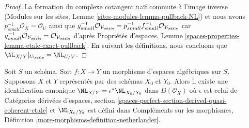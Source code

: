 \begin{proof}
La formation du complexe cotangent naïf commute à l'image inverse
(Modules sur les sites, Lemme \ref{sites-modules-lemma-pullback-NL})
et nous avons $p_{small}^{-1}\mathcal{O}_X = \mathcal{O}_U$ ainsi que
$g_{small}^{-1}\mathcal{O}_{V_\etale} =
p_{small}^{-1}f_{small}^{-1}\mathcal{O}_{Y_\etale}$
car $q_{small}^{-1}\mathcal{O}_{Y_\etale} =
\mathcal{O}_{V_\etale}$ d'après Propriétés d'espaces, Lemme
\ref{spaces-properties-lemma-etale-exact-pullback}.
En suivant les définitions, nous concluons que
$\NL_{X/Y}|_{U_\etale} = \NL_{U/V}$.
\end{proof}

\begin{lemma}
\label{lemma-NL-compare-spaces-schemes}
Soit $S$ un schéma. Soit $f : X \to Y$ un morphisme d'espaces algébriques
sur $S$. Supposons $X$ et $Y$ représentés par des schémas $X_0$ et $Y_0$.
Alors il existe une identification canonique
$\NL_{X/Y} = \epsilon^*\NL_{X_0/Y_0}$ dans $D(\mathcal{O}_X)$
où $\epsilon$ est celui de Catégories dérivées d'espaces, section
\ref{spaces-perfect-section-derived-quasi-coherent-etale}
et $\NL_{X_0/Y_0}$ est défini dans
Compléments sur les morphismes, Définition
\ref{more-morphisms-definition-netherlander}.
\end{lemma}

